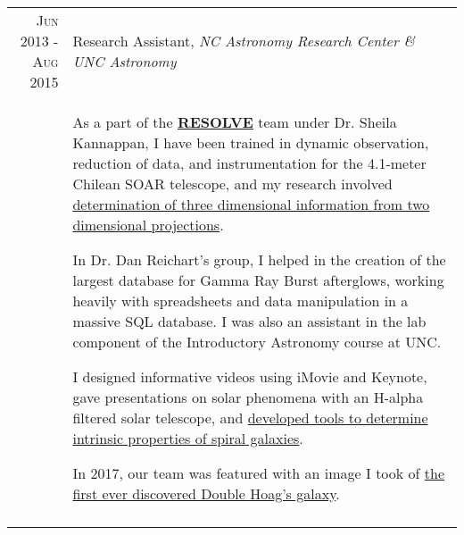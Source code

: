 \documentclass[a4paper, 9pt]{article} %
\begin{document}
\begin{tabular}{r|p{14cm}}
\textsc{Jun 2013 - Aug 2015} & Research Assistant, \emph{NC Astronomy Research Center \& UNC Astronomy}\\
& \footnotesize{As a part of the \textbf{\href{http://resolve.astro.unc.edu/}{RESOLVE}} team under Dr. Sheila Kannappan, I have been trained in dynamic observation, reduction of data, and instrumentation for the 4.1-meter Chilean SOAR telescope, and my research involved \href{https://ui.adsabs.harvard.edu/abs/2015AAS...22533611B/abstract}{determination of three dimensional information from two dimensional projections}.

In Dr. Dan Reichart's group, I helped in the creation of the largest database for Gamma Ray Burst afterglows, working heavily with spreadsheets and data manipulation in a massive SQL database. I was also an assistant in the lab component of the Introductory Astronomy course at UNC.

I designed informative videos using iMovie and Keynote, gave presentations on solar phenomena with an H-alpha filtered solar telescope, and \href{https://ui.adsabs.harvard.edu/abs/2014AAS...22345312T/abstract}{developed tools to determine intrinsic properties of spiral galaxies}.

In 2017, our team was featured with an image I took of \href{http://www.wired.co.uk/article/new-hoag-type-galaxy-discovered}{the first ever discovered Double Hoag's galaxy}.}\\
\multicolumn{2}{c}{} 




\end{tabular}
\end{document}
